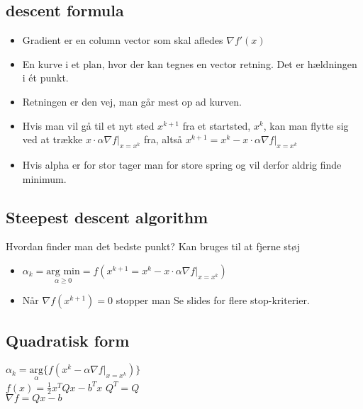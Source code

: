 \documentclass[10pt, a4]{Memoir}
\begin{document}
\subsection{descent formula}
\begin{itemize}
	\item Gradient er en column vector som skal afledes $\nabla f'(x)$
	\item En kurve i et plan, hvor der kan tegnes en vector retning. Det er hældningen i ét punkt.
	\item Retningen er den vej, man går mest op ad kurven.
	\item Hvis man vil gå til et nyt sted $x^{k+1}$ fra et startsted, $x^k$, kan man flytte sig ved at trække $x \cdot \alpha \nabla f |_{x=x^k}$ fra, altså $x^{k+1} = x^k - x \cdot \alpha \nabla f |_{x=x^k}$
	\item Hvis alpha er for stor tager man for store spring og vil derfor aldrig finde minimum.
\end{itemize}

\subsection{Steepest descent algorithm}
Hvordan finder man det bedste punkt?
Kan bruges til at fjerne støj

\begin{itemize}
	\item $\alpha_k = \underset{\alpha \geq 0}{\text{arg min}} = f(x^{k+1} = x^k - x \cdot \alpha \nabla f |_{x=x^k})$
	\item Når $\nabla f(x^{k+1}) = 0$ stopper man
	\subitem Se slides for flere stop-kriterier.
\end{itemize}


\subsection{Quadratisk form}

$\alpha _k = \underset{\alpha}{\text{arg}} \{ f(x^k - \alpha \nabla f|_{x=x^k}) \}$ 
\\
$f(x) = \frac{1}{2} x^T Q x - b^T x$ \quad $Q^T = Q$
\\
$\nabla f = Q x - b$
\end{document}
